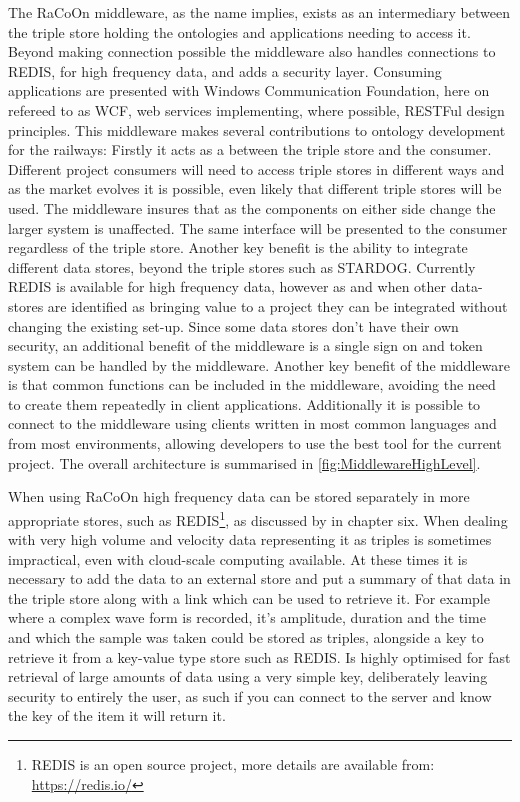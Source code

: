 The RaCoOn middleware, as the name implies, exists as an intermediary between the triple store holding the ontologies and applications needing to access it. Beyond making connection possible the middleware also handles connections to REDIS, for high frequency data, and adds a security layer. Consuming applications are presented with Windows Communication Foundation, here on refereed to as WCF, web services implementing, where possible, RESTFul design principles. This middleware makes several contributions to ontology development for the railways: Firstly it acts as a  between the triple store and the consumer. Different project consumers will need to access triple stores in different ways and as the market evolves it is possible, even likely that different triple stores will be used. The middleware insures that as the components on either side change the larger system is unaffected. The same interface will be presented to the consumer regardless of the triple store. Another key benefit is the ability to integrate different data stores, beyond the triple stores such as STARDOG. Currently REDIS is available for high frequency data, however as and when other data-stores are identified as bringing value to a project they can be integrated without changing the existing set-up. Since some data stores don't have their own security, an additional benefit of the middleware is a single sign on and token system can be handled by the middleware. Another key benefit of the middleware is that common functions can be included in the middleware, avoiding the need to create them repeatedly in client applications. Additionally it is possible to connect to the middleware using clients written in most common languages and from most environments, allowing developers to use the best tool for the current project. The overall architecture is summarised in \autoref{fig:MiddlewareHighLevel}.

When using RaCoOn high frequency data can be stored separately in more appropriate stores, such as REDIS\footnote{REDIS is an open source project, more details are available from: \url{https://redis.io/}}, as discussed by \citet{Tutcher2015} in chapter six. When dealing with very high volume and velocity data representing it as triples is sometimes impractical, even with cloud-scale computing available. At these times it is necessary to add the data to an external store and put a summary of that data in the triple store along with a link which can be used to retrieve it. For example where a complex wave form is recorded, it's amplitude, duration and the time and which the sample was taken could be stored as triples, alongside a key to retrieve it from a key-value type store such as REDIS. Is highly optimised for fast retrieval of large amounts of data using a very simple key, deliberately leaving security to entirely the user, as such if you can connect to the server and know the key of the item it will return it.

